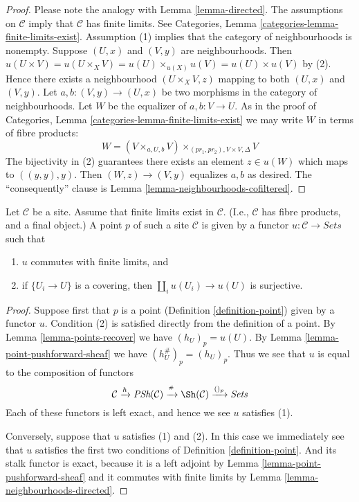 \begin{proof}
Please note the analogy with Lemma \ref{lemma-directed}.
The assumptions on $\mathcal{C}$ imply that $\mathcal{C}$ has finite limits.
See Categories, Lemma \ref{categories-lemma-finite-limits-exist}.
Assumption (1) implies that the category of neighbourhoods
is nonempty. Suppose $(U, x)$ and $(V, y)$ are neighbourhoods.
Then
$u(U \times V) = u(U \times_X V) =
u(U) \times_{u(X)} u(V) = u(U) \times u(V)$ by (2).
Hence there exists a neighbourhood $(U \times_X V, z)$ mapping
to both $(U, x)$ and $(V, y)$.
Let $a, b : (V, y) \to (U, x)$ be two morphisms
in the category of neighbourhoods. Let $W$ be the equalizer of
$a, b : V \to U$. As in the proof of
Categories, Lemma \ref{categories-lemma-finite-limits-exist}
we may write $W$ in terms of fibre products:
$$
W = (V \times_{a, U, b} V) \times_{(pr_1, pr_2), V \times V, \Delta} V
$$
The bijectivity in (2) guarantees there exists an element $z \in u(W)$
which maps to $((y, y), y)$.
Then $(W, z) \to (V, y)$ equalizes $a, b$ as desired.
The ``consequently'' clause is Lemma \ref{lemma-neighbourhoods-cofiltered}.
\end{proof}

\begin{proposition}
\label{proposition-point-limits}
Let $\mathcal{C}$ be a site. Assume that finite limits exist
in $\mathcal{C}$. (I.e., $\mathcal{C}$ has fibre products, and a
final object.) A point $p$ of such a site $\mathcal{C}$
is given by a functor $u : \mathcal{C} \to \textit{Sets}$ such that
\begin{enumerate}
\item $u$ commutes with finite limits, and
\item if $\{U_i \to U\}$ is a covering, then
$\coprod_i u(U_i) \to u(U)$ is surjective.
\end{enumerate}
\end{proposition}

\begin{proof}
Suppose first that $p$ is a point (Definition \ref{definition-point})
given by a functor $u$. Condition (2) is satisfied directly from
the definition of a point. By Lemma \ref{lemma-points-recover}
we have $(h_U)_p = u(U)$. By Lemma \ref{lemma-point-pushforward-sheaf}
we have $(h_U^\#)_p = (h_U)_p$. Thus we see that $u$
is equal to the composition of functors
$$
\mathcal{C} \xrightarrow{h}
\textit{PSh}(\mathcal{C}) \xrightarrow{{}^\#}
\Sh(\mathcal{C}) \xrightarrow{()_p}
\textit{Sets}
$$
Each of these functors is left exact, and hence we see $u$ satisfies (1).

\medskip\noindent
Conversely, suppose that $u$ satisfies (1) and (2).
In this case we immediately see that $u$ satisfies the first two
conditions of Definition \ref{definition-point}. And its
stalk functor is exact, because it is a left adjoint by
Lemma \ref{lemma-point-pushforward-sheaf} and it commutes
with finite limits by Lemma \ref{lemma-neighbourhoods-directed}.
\end{proof}

